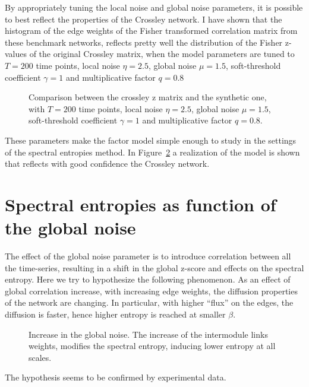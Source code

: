 \documentclass[a4paper]{article}
\begin{document}
By appropriately tuning the local noise and global noise parameters, it is possible to best reflect the properties of the Crossley network.
I have shown that the histogram of the edge weights of the Fisher transformed correlation matrix from these benchmark networks, reflects pretty well the distribution of the Fisher z-values of the original Crossley matrix, when the model parameters are tuned to $T=200$ time points, local noise $\eta=2.5$, global noise $\mu=1.5$, soft-threshold coefficient $\gamma=1$ and multiplicative factor $q=0.8$
\begin{figure}
\caption{Comparison between the crossley z matrix and the synthetic one, with $T=200$ time points, local noise $\eta=2.5$, global noise $\mu=1.5$, soft-threshold coefficient $\gamma=1$ and multiplicative factor $q=0.8$.}
\label{fig:benchmark_network}
\end{figure}

These parameters make the factor model simple enough to study in the settings of the spectral entropies method. In Figure~\ref{fig:benchmark_network} a realization of the model is shown that reflects with good confidence the Crossley network.

\section{Spectral entropies as function of the global noise}
The effect of the global noise parameter is to introduce correlation between all the time-series, resulting in a shift in the global z-score and effects on the spectral entropy. 
Here we try to hypothesize the following phenomenon. As an effect of global correlation increase, with increasing edge weights, the diffusion properties of the network are changing. In particular, with higher ``flux'' on the edges, the diffusion is faster, hence higher entropy is reached at smaller $\beta$.

\begin{figure}
\caption{Increase in the global noise. The increase of the intermodule links weights, modifies the spectral entropy, inducing lower entropy at all scales.}
\label{fig:benchmark_network}
\end{figure}
The hypothesis seems to be confirmed by experimental data.
\end{document}
